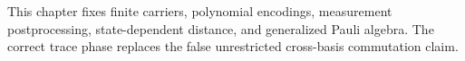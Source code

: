 
This chapter fixes finite carriers, polynomial encodings, measurement
postprocessing, state-dependent distance, and generalized Pauli algebra. The
correct trace phase replaces the false unrestricted cross-basis commutation
claim.


